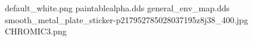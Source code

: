 default_white.png
paintablealpha.dds
general_env_map.dds
smooth_metal_plate_sticker-p217952785028037195z8j38_400.jpg
CHROMIC3.png
